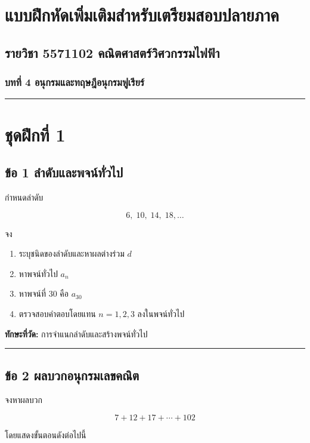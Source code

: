 \section{แบบฝึกหัดเพิ่มเติมสำหรับเตรียมสอบปลายภาค}
\subsection{รายวิชา 5571102 คณิตศาสตร์วิศวกรรมไฟฟ้า}
\subsubsection{บทที่ 4 อนุกรมและทฤษฎีอนุกรมฟูเรียร์}

\par\noindent\rule{\textwidth}{0.4pt}\par

\section{ชุดฝึกที่ 1}

\subsection{ข้อ 1 ลำดับและพจน์ทั่วไป}

กำหนดลำดับ

\[
6,\;10,\;14,\;18,\ldots
\]

จง

\begin{enumerate}
    \item ระบุชนิดของลำดับและหาผลต่างร่วม \(d\)
    \item หาพจน์ทั่วไป \(a_n\)
    \item หาพจน์ที่ 30 คือ \(a_{30}\)
    \item ตรวจสอบคำตอบโดยแทน \(n=1,2,3\) ลงในพจน์ทั่วไป
\end{enumerate}

\textbf{ทักษะที่วัด:} การจำแนกลำดับและสร้างพจน์ทั่วไป

\par\noindent\rule{\textwidth}{0.4pt}\par

\subsection{ข้อ 2 ผลบวกอนุกรมเลขคณิต}

จงหาผลบวก

\[
7+12+17+\cdots+102
\]

โดยแสดงขั้นตอนดังต่อไปนี้

